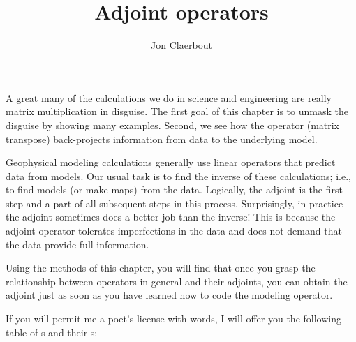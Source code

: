 \def\CAKEDIR{.}

\title{Adjoint operators}
\author{Jon Claerbout}
\label{paper:conj}
\maketitle

A great many of the calculations
we do in science and engineering
are really matrix multiplication in disguise.
The first goal of this chapter is to unmask the disguise
by showing many examples.
Second, we see how the
 operator (matrix transpose)
back-projects information from data to the underlying model.

\par
Geophysical modeling calculations
generally use linear operators that predict data from models.
Our usual task is to find the inverse of these calculations;
i.e., to find models (or make maps) from the data.
Logically, the adjoint is the first step
and a part of all subsequent steps in this  process.
Surprisingly, in practice the adjoint sometimes does a better job
than the inverse!
This is because the adjoint operator tolerates imperfections
in the data and does not demand that the data provide full information.

\par
Using the methods of this chapter,
you will find that
once you grasp the relationship between operators in general
and their adjoints,
you can obtain the adjoint just
as soon as you have learned how to code
the modeling operator.

\par
If you will permit me a poet's license with words,
I will offer you the following table
of s and their s:

